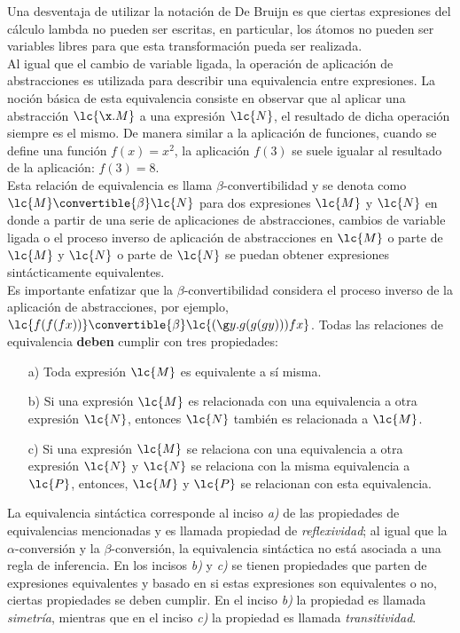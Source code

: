 Una desventaja de utilizar la notación de De Bruijn es que ciertas expresiones
del cálculo lambda no pueden ser escritas, en particular, los átomos no pueden
ser variables libres para que esta transformación pueda ser realizada. \\

Al igual que el cambio de variable ligada, la operación de aplicación de
abstracciones es utilizada para describir una equivalencia entre expresiones. La
noción básica de esta equivalencia consiste en observar que al aplicar una
abstracción \(\lc{\x.M}\) a una expresión \(\lc{N}\), el resultado de dicha
operación siempre es el mismo. De manera similar a la aplicación de funciones,
cuando se define una función \(f(x)=x^{2}\), la aplicación \(f(3)\) se suele
igualar al resultado de la aplicación: \(f(3) = 8\). \\

Esta relación de equivalencia es llama \(\beta\)-convertibilidad y se denota
como \(\lc{M} \convertible{\beta} \lc{N}\) para dos expresiones \(\lc{M}\) y
\(\lc{N}\) en donde a partir de una serie de aplicaciones de abstracciones,
cambios de variable ligada o el proceso inverso de aplicación de abstracciones en
\(\lc{M}\) o parte de \(\lc{M}\) y \(\lc{N}\) o parte de \(\lc{N}\) se puedan
obtener expresiones sintácticamente equivalentes. \\

Es importante enfatizar que la \(\beta\)-convertibilidad considera el proceso
inverso de la aplicación de abstracciones, por ejemplo, \(\lc{f(f(f x))}
\convertible{\beta} \lc{(\g y.g(g(g y)))f x}\). Todas las relaciones de
equivalencia \textbf{deben} cumplir con tres propiedades:

\begin{itemize}
\item[a)] Toda expresión \(\lc{M}\) es equivalente a sí misma.
\item[b)] Si una expresión \(\lc{M}\) es relacionada con una equivalencia a otra
  expresión \(\lc{N}\), entonces \(\lc{N}\) también es relacionada a \(\lc{M}\).
\item[c)] Si una expresión \(\lc{M}\) se relaciona con una equivalencia a otra
  expresión \(\lc{N}\) y \(\lc{N}\) se relaciona con la misma equivalencia a
  \(\lc{P}\), entonces, \(\lc{M}\) y \(\lc{P}\) se relacionan con esta equivalencia.
\end{itemize}

La equivalencia sintáctica corresponde al inciso \emph{a)} de las propiedades de
equivalencias mencionadas y es llamada propiedad de \emph{reflexividad}; al
igual que la \(\alpha\)-conversión y la \(\beta\)-conversión, la equivalencia
sintáctica no está asociada a una regla de inferencia. En los incisos \emph{b)}
y \emph{c)} se tienen propiedades que parten de expresiones equivalentes y
basado en si estas expresiones son equivalentes o no, ciertas propiedades se
deben cumplir. En el inciso \emph{b)} la propiedad es llamada \emph{simetría},
mientras que en el inciso \emph{c)} la propiedad es llamada
\emph{transitividad}. \\


